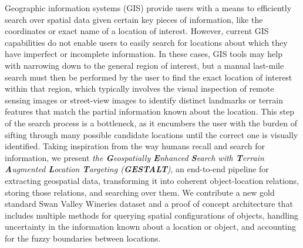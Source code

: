 

Geographic information systems (GIS) provide users with a means to efficiently search over spatial data given certain key pieces of information, like the coordinates or exact name of a location of interest. However, current GIS capabilities do not enable users to easily search for locations about which they have imperfect or incomplete information. In these cases, GIS tools may help with narrowing down to the general region of interest, but a manual last-mile search must then be performed by the user to find the exact location of interest within that region, which typically involves the visual inspection of remote sensing images or street-view images to identify distinct landmarks or terrain features that match the partial information known about the location. This step of the search process is a bottleneck, as it encumbers the user with the burden of sifting through many possible candidate locations until the correct one is visually identified. Taking inspiration from the way humans recall and search for information, we present \textit{the \textbf{G}eospatially \textbf{E}nhanced \textbf{S}earch with \textbf{T}errain \textbf{A}ugmented \textbf{L}ocation \textbf{T}argeting (\textbf{GESTALT})}, an end-to-end pipeline for extracting geospatial data, transforming it into coherent object-location relations, storing those relations, and searching over them. We contribute a new gold standard Swan Valley Wineries dataset and a proof of concept architecture that includes multiple methods for querying spatial configurations of objects, handling uncertainty in the information known about a location or object, and accounting for the fuzzy boundaries between locations.